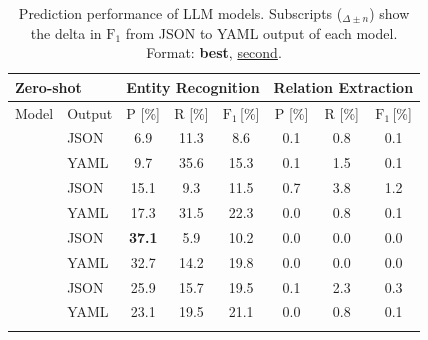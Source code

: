 \begin{table}[tb]
  \centering
  \caption[Prediction performance of LLM models]{Prediction performance of LLM models. Subscripts (${}_{\Delta\pm n}$) show the delta in $\text{F}_1$ from JSON to YAML output of each model. Format: \textbf{best}, \underline{second}.}
  \label{tab:llmeval}
  \begin{tabular}{ll|ccc|ccc}
    \hline
    \multicolumn{2}{l|}{\textbf{Zero-shot}} &
    \multicolumn{3}{c|}{Entity Recognition} &
    \multicolumn{3}{c}{Relation Extraction} \\
    \hline
    Model & Output & P [\%] & R [\%] & $\text{F}_1$\,[\%] &
                     P [\%] & R [\%] & $\text{F}_1$\,[\%] \\
    \hline

    \arrayrulecolor{lightgrey}\cline{1-2}\arrayrulecolor{black}
    \multirow{2}{*}{WizardLM} &
    JSON & 6.9 & 11.3 & 8.6
              & 0.1 & 0.8 & 0.1 \\
    \ & YAML & 9.7 & 35.6 &
    \hphantom{${}_{\Delta\text{+6.7}}$}
    15.3{\color{parametergreen}{${}_{\Delta\text{+6.7}}$}}
              & 0.1 & 1.5 &
    \hphantom{${}_{\Delta\text{+0.0}}$}
    0.1{\color{contextgrey}{${}_{\Delta\text{+0.0}}$}}  \\
    \arrayrulecolor{lightgrey}\cline{1-2}\arrayrulecolor{black}

    \multirow{2}{*}{Vicuna${}_{4k}$} &
    JSON & 15.1 & 9.3 & 11.5
              & 0.7 & 3.8 & 1.2 \\
    \ & YAML & 17.3 & 31.5 &
    \hphantom{${}_{\Delta\text{+10.8}}$}
    22.3{\color{parametergreen}{${}_{\Delta\text{+10.8}}$}}
              & 0.0 & 0.8 &
    \hphantom{${}_{\Delta\text{-1.1}}$}
    0.1{\color{valuered}{${}_{\Delta\text{-1.1}}$}}  \\
    \arrayrulecolor{lightgrey}\cline{1-2}\arrayrulecolor{black}

    \multirow{2}{*}{Falcon} &
    JSON & \textbf{37.1} & 5.9 & 10.2
              & 0.0 & 0.0 & 0.0 \\
    \ & YAML & 32.7 & 14.2 &
    \hphantom{${}_{\Delta\text{+9.6}}$}
    19.8{\color{parametergreen}{${}_{\Delta\text{+9.6}}$}}
              & 0.0 & 0.0 &
    \hphantom{${}_{\Delta\text{+0.0}}$}
    0.0{\color{contextgrey}{${}_{\Delta\text{+0.0}}$}}  \\
    \arrayrulecolor{lightgrey}\cline{1-2}\arrayrulecolor{black}

    \multirow{2}{*}{GALACTICA} &
    JSON & 25.9 & 15.7 & 19.5
              & 0.1 & 2.3 & 0.3 \\
    \ & YAML & 23.1 & 19.5 &
    \hphantom{${}_{\Delta\text{+1.6}}$}
    21.1{\color{parametergreen}{${}_{\Delta\text{+1.6}}$}}
              & 0.0 & 0.8 &
    \hphantom{${}_{\Delta\text{-0.2}}$}
    0.1{\color{valuered}{${}_{\Delta\text{-0.2}}$}}  \\
    \arrayrulecolor{lightgrey}\cline{1-2}\arrayrulecolor{black}


\end{tabular}
\end{table}
